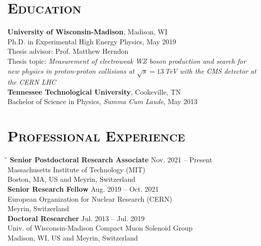 \documentclass[10pt]{res} %
\begin{document}

\address{\textbf{Current Address} \\  CERN B40/2-A20 \\  Geneva 23 \\ Switzerland \\ Tel: +41 77 501 95 13 }
\address{}

\begin{resume}
\section{\textsc{Education}}
  \textbf{University of Wisconsin-Madison}, Madison, WI \\
Ph.D. in Experimental High Energy Physics, May 2019 \\
  Thesis advisor: Prof. Matthew Herndon \\
    Thesis topic: \emph{Measurement of electroweak WZ boson production and search for new physics in proton-proton collisions at $\sqrt{s}=13$\,TeV with the CMS detector at the CERN LHC} \\
  \textbf{Tennessee Technological University}, Cookeville, TN \\
Bachelor of Science in Physics, \textit{Summa Cum Laude}, May 2013

\section{\textsc{Professional Experience}}
\vspace{-0.1in}
\begin{tabbing}
\hspace{2.3in}\= \hspace{2.4in}\= \kill %
{\bf Senior Postdoctoral Research Associate} \>\> Nov. 2021 -- Present \\
Massachusetts Institute of Technology (MIT)   \\  Boston, MA, US and Meyrin, Switzerland \\
{\bf Senior Research Fellow} \>\> Aug. 2019 -- Oct. 2021 \\
European Organization for Nuclear Research (CERN)   \\  Meyrin, Switzerland \\
{\bf Doctoral Researcher} \>\> Jul. 2013 -- Jul. 2019\\
Univ. of Wisconsin-Madison Compact Muon Solenoid Group \\  Madison, WI, US and Meyrin, Switzerland \\
\end{tabbing}\vspace{-20pt}      %


\end{resume}
\end{document}
